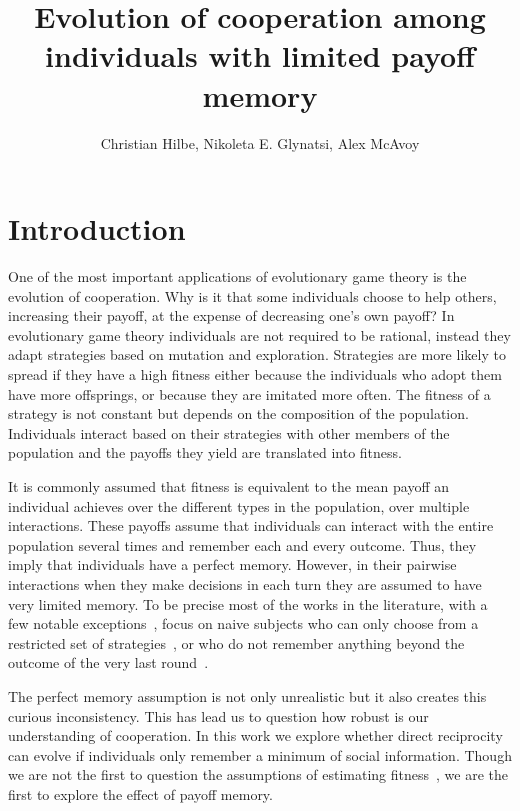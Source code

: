 \documentclass[11pt]{article}
\title{
\bf  \sffamily \LARGE Evolution of cooperation among individuals with limited payoff memory\\}
\date{}
\author{Christian Hilbe, Nikoleta E. Glynatsi, Alex McAvoy}
\theoremstyle{plainCl1}
\theoremstyle{plainCl2}
\begin{document}
\maketitle

\begin{abstract}

\end{abstract}

\section{Introduction}

One of the most important applications of evolutionary game theory is the
evolution of cooperation. Why is it that some individuals choose to help others,
increasing their payoff, at the expense of decreasing one's own payoff? In
evolutionary game theory individuals are not required to be rational, instead
they adapt strategies based on mutation and exploration. Strategies are more
likely to spread if they have a high fitness either because the individuals who
adopt them have more offsprings, or because they are imitated more often. The
fitness of a strategy is not constant but depends on the composition of the
population. Individuals interact based on their strategies with other
members of the population and the payoffs they yield are translated into
fitness.

It is commonly assumed that fitness is equivalent to the mean payoff an
individual achieves over the different types in the population, over multiple
interactions. These payoffs assume that individuals can interact with the entire
population several times and remember each and every outcome. Thus, they imply
that individuals have a perfect memory.
However, in their pairwise interactions when they make decisions in each turn
they are assumed to have very limited memory. To be precise most of
the works in the literature,  with a few notable exceptions~\cite{Hauert1997,
Stewart2016}, focus on naive subjects who can only choose from a restricted set
of strategies~\cite{Nowak1992tit}, or who do not remember anything beyond the
outcome of the very last round~\cite{Baek2016}.

The perfect memory assumption is not only unrealistic but it also creates this
curious inconsistency. This has lead us to question how robust is our
understanding of cooperation. In this work we explore whether direct
reciprocity can evolve if individuals only remember a minimum of social
information. Though we are not the first to question the assumptions of
estimating fitness~\cite{Roca2006}, we are the first to explore the effect
of payoff memory.
\end{document}
